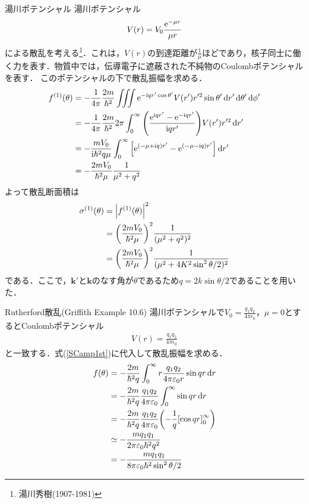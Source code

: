 \documentclass{report}
\begin{document}
 \begin{myex}{湯川ポテンシャル}{}
湯川ポテンシャル
\begin{align}
  V(r) = V_0 \frac{\mathrm{e}^{-\mu r}}{\mu r}
\end{align}
による散乱を考える\footnote{湯川秀樹(1907-1981)}．これは，$V(r)$の到達距離が$\frac{1}{\mu}$ほどであり，核子同士に働く力を表す．物質中では，伝導電子に遮蔽された不純物のCoulombポテンシャルを表す．
このポテンシャルの下で散乱振幅を求める．
\begin{align}
  f^{(1)}(\theta) &= -\frac{1}{4\pi} \frac{2m}{\hbar^2} \iiint \mathrm{e}^{-\mathrm{i} qr'\cos\theta'}V(r') r'^2 \sin\theta'\dd{r'}\dd{\theta'}\dd{\phi'}\\
  &= -\frac{1}{4\pi}\frac{2m}{\hbar^2} 2\pi \int_{0}^{\infty} \qty(\frac{\mathrm{e}^{\mathrm{i} qr'} - \mathrm{e}^{-\mathrm{i} qr'}}{\mathrm{i} qr'})V(r') r'^2 \dd{r'}\\
  &= -\frac{mV_0}{\mathrm{i} \hbar^2 q \mu} \int_{0}^{\infty} \qty[\mathrm{e}^{(-\mu + \mathrm{i} q)r'} - \mathrm{e}^{(-\mu - \mathrm{i} q)r'}] \dd{r'}\\
  &= - \frac{2m V_0}{\hbar^2 \mu} \frac{1}{\mu^2 + q^2}
\end{align}
よって散乱断面積は
\begin{align}
  \sigma^{(1)}(\theta) &= \abs{f^{(1)}(\theta)}^2\\
  &= \qty(\frac{2m V_0}{\hbar^2 \mu})^2 \frac{1}{(\mu^2 + q^2)^2}\\
  &= \qty(\frac{2m V_0}{\hbar^2 \mu})^2 \frac{1}{(\mu^2 + 4K^2 \sin^2\theta/2)^2}
\end{align}
である．ここで，$\bm{k'}$と$\bm{k}$のなす角が$\theta$であるため$q = 2k\sin\theta/2$であることを用いた．
 \end{myex}
\begin{myex}{Rutherford散乱(Griffith Example 10.6)}{}
  湯川ポテンシャルで$V_0 = \frac{q_1q_2}{4\pi \epsilon_0}$，$\mu = 0$とするとCoulombポテンシャル
  \begin{align}
    V(r) = \frac{q_1q_2}{4\pi\epsilon_0}
  \end{align}
  と一致する．式(\ref{SCamp1st})に代入して散乱振幅を求める．
  \begin{align}
    f(\theta) &= - \frac{2m}{\hbar^2q} \int_{0}^{\infty} r \frac{q_1q_2}{4\pi\varepsilon_0 r} \sin qr \dd{r}\\
    &= -\frac{2m}{\hbar^2q}\frac{q_1q_2}{4\pi\varepsilon_0}\int_{0}^{\infty} \sin qr \dd{r} \\
    &=  -\frac{2m}{\hbar^2q}\frac{q_1q_2}{4\pi\varepsilon_0}\qty(-\frac{1}{q}\qty[\cos qr]_0^{\infty})\\
    &\simeq - \frac{mq_1q_1}{2\pi\varepsilon_0\hbar^2q^2}\\
    &= - \frac{mq_1q_1}{8\pi\varepsilon_0\hbar^2 \sin^2 \theta/2}
  \end{align}
\end{myex}
\end{document}

